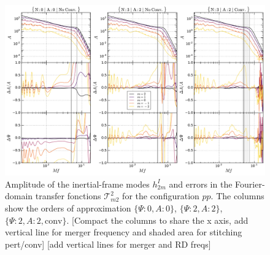 \documentclass[aps,showpacs,twocolumn,
prd,superscriptaddress,nofootinbib]{revtex4-1}
\newcommand\calT{{\mathcal{T}}}
\newcommand{\SM}[1]{{\color{Red} #1}}
\begin{document}
\begin{figure}
  \centering
  \includegraphics[width=.98\linewidth]{plots/precerror_pp_py.pdf}
  \caption{Amplitude of the inertial-frame modes $h^{I}_{2m}$ and errors in the Fourier-domain transfer fonctions $\calT^{2}_{m2}$ for the configuration $pp$. The columns show the orders of approximation $\{\Psi:0,A:0\}$, $\{\Psi:2,A:2\}$, $\{\Psi:2,A:2,\text{conv}\}$. \SM{[Compact the columns to share the x axis, add vertical line for merger frequency and shaded area for stitching pert/conv]} \SM{[add vertical lines for merger and RD freqs]}}
  \label{fig:precerrorspp}
\end{figure}
\end{document}
